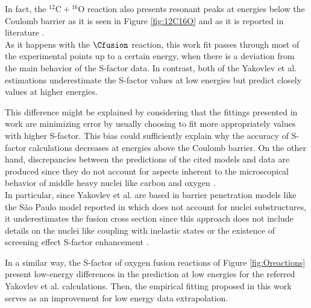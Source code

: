 \documentclass[openany]{book}
\begin{document}
In fact, the $\mathrm{{}^{12}C + {}^{16}O}$ reaction also presents resonant peaks at energies below the Coulomb barrier as it is seen in Figure \ref{fig:12C16O} and as it is reported in literature \cite{torilov_maltsev_zherebchevsky_2021}. \\

As it happens with the $\Cfusion$ reaction, this work fit passes through most of the experimental points up to a certain energy, when there is a deviation from the main behavior of the S-factor data. In contrast, both of the Yakovlev et al. estimations underestimate the S-factor values at low energies but predict closely values at higher energies. \\


This difference might be explained by considering that the fittings presented in work are minimizing error by usually choosing to fit more appropriately values with higher S-factor. This bias could sufficiently explain why the accuracy of S-factor calculations decreases at energies above the Coulomb barrier. On the other hand, discrepancies between the predictions of the cited models and data are produced since they do not account for aspects inherent to the microscopical behavior of middle heavy nuclei like carbon and oxygen  \cite{duarte_gasques_oliveira_zagatto_chamon_medina_added_seale_alcantara-nunez_rossi_et_2015}. \\

In particular,  since Yakovlev et al. are based in barrier penetration models like the São Paulo model reported in \cite{yakovlev_beard_gasques_wiescher_2010} which does not account for nuclei substructures, it underestimates the fusion cross section since this approach does not include details on the nuclei like coupling with inelastic states or the existence of screening effect S-factor enhancement \cite{koyuncu_soylu_2018}.

In a similar way, the S-factor of oxygen fusion reactions of Figure \ref{fig:Oreactions} present low-energy differences in the prediction at low energies for the referred Yakovlev et al. calculations. Then, the empirical fitting proposed in this work serves as an improvement for low energy data extrapolation. \\
\end{document}
